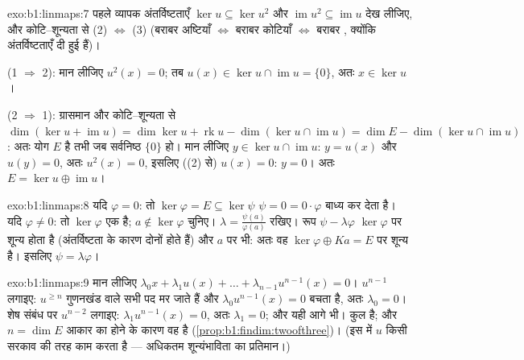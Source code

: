 \begin{solution}{exo:b1:linmaps:7}
पहले व्यापक अंतर्विष्टताएँ $\ker u \subseteq \ker u^2$ और $\operatorname{im}
u^2 \subseteq \operatorname{im} u$ देख लीजिए, और कोटि--शून्यता से (2) $\iff$
(3) (बराबर अष्टियाँ $\iff$ बराबर कोटियाँ $\iff$ बराबर , क्योंकि
अंतर्विष्टताएँ दी हुई हैं)।

(1 $\Rightarrow$ 2): मान लीजिए $u^2(x) = 0$; तब $u(x) \in \ker u \cap
\operatorname{im} u = \{0\}$, अतः $x \in \ker u$।

(2 $\Rightarrow$ 1): ग्रासमान और कोटि--शून्यता से $\dim(\ker u +
\operatorname{im} u) = \dim\ker u + \operatorname{rk} u - \dim(\ker u \cap
\operatorname{im} u) = \dim E - \dim(\ker u \cap \operatorname{im} u)$: अतः
योग $E$ है तभी जब सर्वनिष्ठ $\{0\}$ हो। मान लीजिए $y \in \ker u \cap
\operatorname{im} u$: $y = u(x)$ और $u(y) = 0$, अतः $u^2(x) = 0$, इसलिए ((2)
से) $u(x) = 0$: $y = 0$। अतः $E = \ker u \oplus \operatorname{im} u$।
\end{solution}

\begin{solution}{exo:b1:linmaps:8}
यदि $\varphi = 0$: तो $\ker\varphi = E \subseteq \ker\psi$ $\psi = 0 =
0\cdot\varphi$ बाध्य कर देता है। यदि $\varphi \neq 0$: तो $\ker\varphi$ एक
 है; $a \notin \ker\varphi$ चुनिए। $\lambda =
\frac{\psi(a)}{\varphi(a)}$ रखिए। रूप $\psi - \lambda\varphi$ $\ker\varphi$
पर शून्य होता है (अंतर्विष्टता के कारण दोनों होते हैं) और $a$ पर भी: अतः वह
$\ker\varphi \oplus Ka = E$ पर शून्य है। इसलिए $\psi = \lambda\varphi$।
\end{solution}

\begin{solution}{exo:b1:linmaps:9}
मान लीजिए $\lambda_0 x + \lambda_1 u(x) + \dots + \lambda_{n-1} u^{n-1}(x) =
0$। $u^{n-1}$ लगाइए: $u^{\geq n}$ गुणनखंड वाले सभी पद मर जाते हैं और
$\lambda_0 u^{n-1}(x) = 0$ बचता है, अतः $\lambda_0 = 0$। शेष संबंध पर
$u^{n-2}$ लगाइए: $\lambda_1 u^{n-1}(x) = 0$, अतः $\lambda_1 = 0$; और यही आगे
भी। कुल  है; और $n = \dim E$ आकार का होने के कारण वह  है
(\cref{prop:b1:findim:twoofthree})। (इस  में $u$ किसी सरकाव की तरह काम
करता है --- अधिकतम शून्यंभाविता का प्रतिमान।)
\end{solution}


